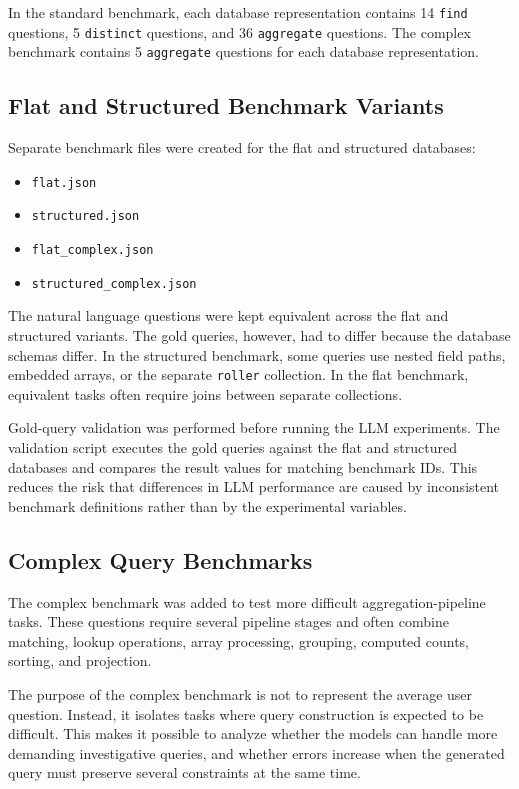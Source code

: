 In the standard benchmark, each database representation contains 14 \texttt{find} questions, 5 \texttt{distinct} questions, and 36 \texttt{aggregate} questions. The complex benchmark contains 5 \texttt{aggregate} questions for each database representation.

\subsection{Flat and Structured Benchmark Variants}

Separate benchmark files were created for the flat and structured databases:

\begin{itemize}
    \item \texttt{flat.json}
    \item \texttt{structured.json}
    \item \texttt{flat\_complex.json}
    \item \texttt{structured\_complex.json}
\end{itemize}

The natural language questions were kept equivalent across the flat and structured variants. The gold queries, however, had to differ because the database schemas differ. In the structured benchmark, some queries use nested field paths, embedded arrays, or the separate \texttt{roller} collection. In the flat benchmark, equivalent tasks often require joins between separate collections.

Gold-query validation was performed before running the LLM experiments. The validation script executes the gold queries against the flat and structured databases and compares the result values for matching benchmark IDs. This reduces the risk that differences in LLM performance are caused by inconsistent benchmark definitions rather than by the experimental variables.

\subsection{Complex Query Benchmarks}

The complex benchmark was added to test more difficult aggregation-pipeline tasks. These questions require several pipeline stages and often combine matching, lookup operations, array processing, grouping, computed counts, sorting, and projection.

The purpose of the complex benchmark is not to represent the average user question. Instead, it isolates tasks where query construction is expected to be difficult. This makes it possible to analyze whether the models can handle more demanding investigative queries, and whether errors increase when the generated query must preserve several constraints at the same time.


